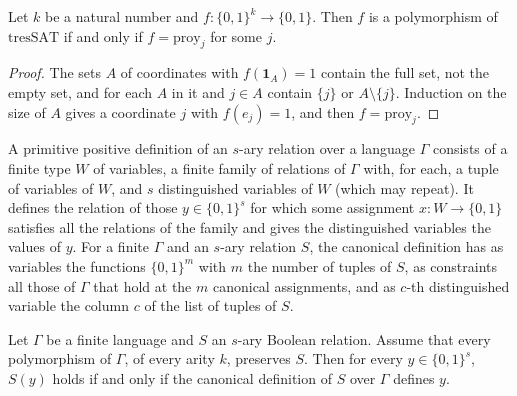\begin{theorem}
  \label{thm:structure-tressat-pol-todas}
  \leanok
  Let $k$ be a natural number and $f : \{0,1\}^k \to \{0,1\}$. Then $f$ is a polymorphism of
  $\mathrm{tresSAT}$ if and only if $f = \mathrm{proy}_j$ for some $j$.
  \own{}
\end{theorem}

\begin{proof}
  \leanok
  The sets $A$ of coordinates with $f(\mathbf{1}_A) = 1$ contain the full set, not the empty set,
  and for each $A$ in it and $j \in A$ contain $\{j\}$ or $A \setminus \{j\}$. Induction on the
  size of $A$ gives a coordinate $j$ with $f(e_j) = 1$, and then $f = \mathrm{proy}_j$.
\end{proof}

\begin{definition}
  \label{def:structure-pp}
  \leanok
  A primitive positive definition of an $s$-ary relation over a language $\Gamma$ consists of a
  finite type $W$ of variables, a finite family of relations of $\Gamma$ with, for each, a tuple of
  variables of $W$, and $s$ distinguished variables of $W$ (which may repeat). It defines the
  relation of those $y \in \{0,1\}^s$ for which some assignment $x : W \to \{0,1\}$ satisfies all
  the relations of the family and gives the distinguished variables the values of $y$. For a finite
  $\Gamma$ and an $s$-ary relation $S$, the canonical definition has as variables the functions
  $\{0,1\}^{m}$ with $m$ the number of tuples of $S$, as constraints all those of $\Gamma$ that hold
  at the $m$ canonical assignments, and as $c$-th distinguished variable the column $c$ of the
  list of tuples of $S$.
  \own{}
\end{definition}

\begin{theorem}
  \label{thm:structure-galois}
  \leanok
  Let $\Gamma$ be a finite language and $S$ an $s$-ary Boolean relation. Assume that every
  polymorphism of $\Gamma$, of every arity $k$, preserves $S$. Then for every $y \in \{0,1\}^s$,
  $S(y)$ holds if and only if the canonical definition of $S$ over $\Gamma$ defines $y$.
\end{theorem}

